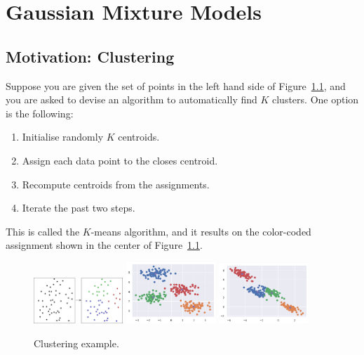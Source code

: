 \chapter{Gaussian Mixture Models}
\label{ch:gmm}

\section{Motivation: Clustering}

Suppose you are given the set of points in the left hand side of Figure~\ref{fig:clustering-example}, and you are asked to devise an algorithm to automatically find $K$ clusters. One option is the following:
\begin{enumerate}
    \item Initialise randomly $K$ centroids.
    \item Assign each data point to the closes centroid.
    \item Recompute centroids from the assignments.
    \item Iterate the past two steps.
\end{enumerate}\vspace{3mm}

This is called the $K$-means algorithm, and it results on the color-coded assignment shown in the center of Figure~\ref{fig:clustering-example}.

\begin{figure}[H]
    \centering
    \includegraphics[width=0.3\textwidth]{fig/clustering}
    \hfill
    \includegraphics[width=0.3\textwidth]{fig/clustering_done}
    \hfill
    \includegraphics[width=0.3\textwidth]{fig/clustering_fail}
    \caption{Clustering example.\label{fig:clustering-example}}
\end{figure}

